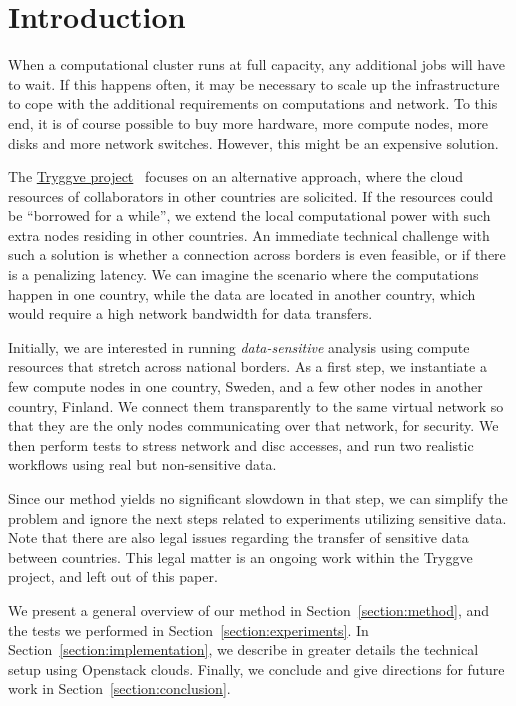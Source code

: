\section{Introduction}
\label{section:intro}

When a computational cluster runs at full capacity, any additional jobs will
have to wait. If this happens often, it may be necessary to scale up
the infrastructure to cope with the additional requirements on computations and network. To
this end, it is of course possible to buy more hardware, \ie more
compute nodes, more disks and more network switches. However, this
might be an expensive solution.

The \href{https://wiki.neic.no/wiki/Tryggve}{Tryggve
  project}~\cite{tryggve} focuses on an alternative
approach, where the cloud resources of collaborators in other countries are solicited.
%
If the resources could be ``borrowed for a while'', we extend the local
computational power with such extra nodes residing in other countries.
%
An immediate technical challenge with such a solution is whether a
connection across borders is even feasible, or if there is a
penalizing latency. We can imagine the scenario where the computations
happen in one country, while the data are located in another country,
which would require a high network bandwidth for data transfers.

Initially, we are interested in running \emph{data-sensitive}
analysis using compute resources that stretch across national borders.
%
As a first step, we instantiate a few compute nodes in one country,
Sweden, and a few other nodes in another country, Finland. We
connect them transparently to the same virtual network so that they are
the only nodes communicating over that network, for security. We then
perform tests to stress network and disc accesses, and run two
realistic workflows using real but non-sensitive data.

Since our method yields no significant slowdown in that step, we
can simplify the problem and ignore the next steps related to
experiments utilizing sensitive data.
%
Note that there are also legal issues regarding the transfer of sensitive
data between countries. This legal matter is an ongoing work within
the Tryggve project, and left out of this paper.

We present a general overview of our method in
Section~\ref{section:method}, and the tests we performed in
Section~\ref{section:experiments}.
%
In Section~\ref{section:implementation}, we describe in greater
details the technical setup using Openstack clouds.
%
Finally, we conclude and give directions for future work in
Section~\ref{section:conclusion}.
